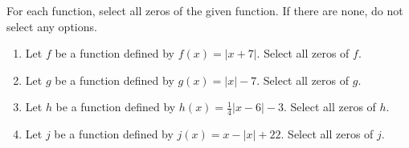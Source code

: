 \documentclass{ximera}
\author{Kenneth Berglund}
\begin{document}
\begin{exercise}
For each function, select all zeros of the given function. If there are none, do not select any options.

\begin{enumerate}
\item Let $f$ be a function defined by $f(x) = |x + 7|$.
Select all zeros of $f$.
\begin{selectAll}
\end{selectAll}

\item Let $g$ be a function defined by $g(x) = |x| - 7$.
Select all zeros of $g$.
\begin{selectAll}
\end{selectAll}

\item Let $h$ be a function defined by $h(x) = \frac{1}{4}|x - 6| - 3$.
Select all zeros of $h$.
\begin{selectAll}
\end{selectAll}

\item Let $j$ be a function defined by $j(x) = x - |x| + 22$.
Select all zeros of $j$.
\begin{selectAll}
\end{selectAll}

\end{enumerate}

\end{exercise}
\end{document}
